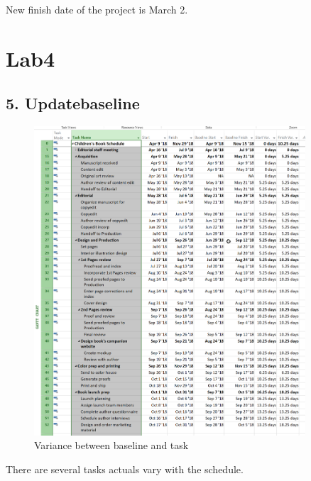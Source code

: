 \documentclass[runningheads]{llncs}
\begin{document}
New finish date of the project is March 2.

\clearpage
\section*{Lab4}
\subsection*{5. Updatebaseline}
\begin{figure}[H]
    \centering
    \includegraphics[width=0.9\textwidth]{./image/t4f1}
    \caption{Variance between baseline and task}
\end{figure}

There are several tasks actuals vary with the schedule.
\end{document}
